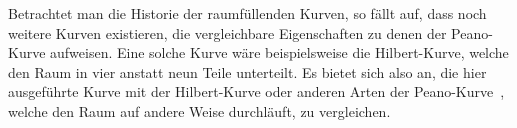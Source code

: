 \documentclass[course=asp]{aspdoc}
\begin{document}


Betrachtet man die Historie der raumf\"ullenden Kurven, so f\"allt auf, dass noch weitere Kurven existieren, die vergleichbare Eigenschaften zu denen der Peano-Kurve aufweisen. Eine solche Kurve w\"are beispielsweise die Hilbert-Kurve, welche den Raum in vier anstatt neun Teile unterteilt. Es bietet sich also an, die hier ausgef\"uhrte Kurve mit der Hilbert-Kurve oder anderen Arten der Peano-Kurve~\cite{raumKurven}, welche den Raum auf andere Weise durchl\"auft, zu vergleichen.


\newpage

{}
\end{document}
